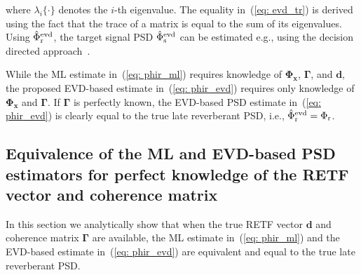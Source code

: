 \documentclass[10pt]{IEEEtran}
\begin{document}
where $\lambda_i\{ \cdot \}$ denotes the $i$-th eigenvalue.
The equality in~(\ref{eq: evd_tr}) is derived using the fact that the trace of a matrix is equal to the sum of its eigenvalues. 
Using $\hat{\Phi}^{\rm evd}_{{\rm r}}$, the target signal PSD $\hat{\Phi}^{\rm evd}_{{\rm s}}$ can be estimated e.g., using the decision directed approach~\cite{Ephraim_ITASSP_1984}.

While the ML estimate in~(\ref{eq: phir_ml}) requires knowledge of $\boldsymbol{\Phi}_{\mathbf{x}}$, $\boldsymbol{\Gamma}$, and $\mathbf{d}$, the proposed EVD-based estimate in~(\ref{eq: phir_evd}) requires only knowledge of $\boldsymbol{\Phi}_{\mathbf{x}}$ and $\boldsymbol{\Gamma}$.
If $\boldsymbol{\Gamma}$ is perfectly known, the EVD-based PSD estimate in~(\ref{eq: phir_evd}) is clearly equal to the true late reverberant PSD, i.e., $\hat{\Phi}^{\rm evd}_{\rm r} = \Phi_{\rm r}$.

\subsection{Equivalence of the ML and EVD-based  PSD estimators for perfect knowledge of the RETF vector and coherence matrix}
\label{sec: equi}
In this section we analytically show that when the true RETF vector $\mathbf{d}$ and coherence matrix $\boldsymbol{\Gamma}$ are available, the ML estimate in~(\ref{eq: phir_ml}) and the EVD-based estimate in~(\ref{eq: phir_evd}) are equivalent and equal to the true late reverberant PSD.
\end{document}
